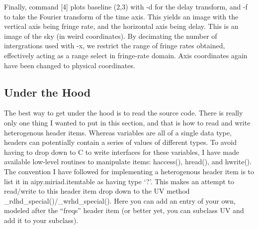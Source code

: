 Finally, command [4] plots baseline (2,3) with -d for the delay transform,
and -f to take the Fourier transform of the time axis.  This yields an
image with the vertical axis being fringe rate, and the horizontal axis being
delay.  This is an image of the sky (in weird coordinates).  By decimating
the number of intergrations used with -x, we restrict the range of fringe
rates obtained, effectively acting as a range select in fringe-rate domain.
Axis coordinates again have been changed to physical coordinates.

\subsection{Under the Hood}

The best way to get under the hood is to read the source code.  There is really
only one thing I wanted to put in this section, and that is how to read and
write heterogenous header items.  Whereas variables are all of a single data
type, headers can potentially contain a series of values of different types.
To avoid having to drop down to C to write interfaces for these variables, I
have made available low-level routines to manipulate items: haccess(), hread(),
and hwrite().  The convention I have followed for implementing a heterogenous
header item is to list it in aipy.miriad.itemtable as having type `?'.  This
makes an attempt to read/write to this header item drop down to the UV method
\_rdhd\_special()/\_wrhd\_special().  Here you can add an entry of your own,
modeled after the ``freqs'' header item (or better yet, you can subclass
UV and add it to your subclass).

